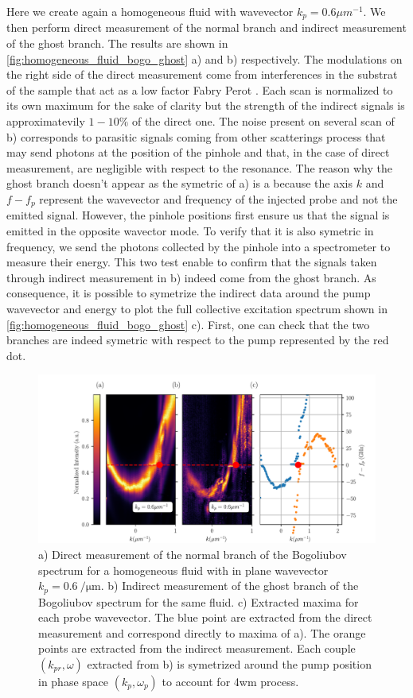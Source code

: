 Here we create again a homogeneous fluid with wavevector $k_p =0.6 \mu m^{-1}$. We then 
perform direct measurement of the normal branch and indirect measurement of the ghost branch. The results are shown in \autoref{fig:homogeneous_fluid_bogo_ghost} a) and b) respectively.  The modulations on the right side of the direct measurement come from interferences in the substrat of the sample
that act as a low factor Fabry Perot \cite{claude_phd}. Each scan is normalized to its own maximum for the sake of clarity but 
the strength of the indirect signals is approximatevily $1-10\%$ of the direct one. The noise present on several scan of b) corresponds to parasitic signals coming from other scatterings process that may send photons at the position of the pinhole and that, in the case of direct measurement, are negligible with respect to the resonance. The reason why the ghost branch doesn't appear as the symetric of a) 
is a because the axis $k$ and $f-f_p$ represent the wavevector and frequency of the injected probe and not the emitted signal. However, the pinhole positions first ensure us that the signal is emitted in the opposite wavector mode. To verify that it is also symetric in frequency, we send the photons collected by the pinhole 
into a spectrometer to measure their energy. This two test enable to confirm that the signals taken through indirect measurement in b) indeed come from the ghost branch. As consequence, it is possible  to symetrize the indirect data around the pump wavevector and energy to plot the full collective excitation spectrum shown in \autoref{fig:homogeneous_fluid_bogo_ghost} c). First, one can check that the two branches 
are indeed symetric with respect to the pump represented by the red dot.
\begin{figure}
    \centering
    \includegraphics[width=1\textwidth]{chap3_custom_st/fig/supersonic_homogenous.pdf}
    \caption{a) Direct measurement of the normal branch of the Bogoliubov spectrum for a homogeneous fluid with in plane wavevector $k_p=\SI{0.6}{\per \micro \meter}.$ b) Indirect measurement of the ghost branch of the Bogoliubov spectrum for the same fluid.
    c) Extracted maxima for each probe wavevector. The blue point are extracted from the direct measurement and correspond directly to maxima of a). The orange points are extracted from the indirect measurement. Each couple $(k_{pr}, \omega)$ extracted from b) is symetrized around the pump position in phase space $(k_p, \omega_p)$ to account for 4wm process.}
    \label{fig:homogeneous_fluid_bogo_ghost}

\end{figure}

